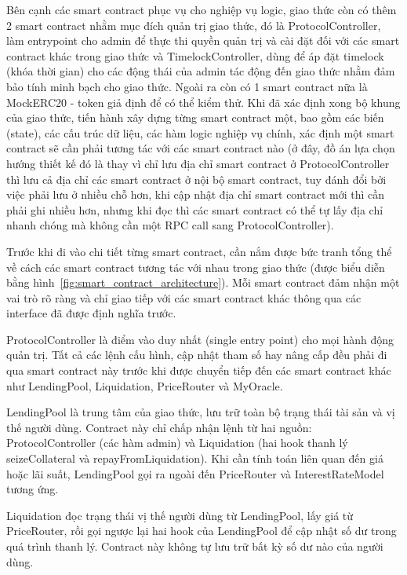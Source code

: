\documentclass[../DoAn.tex]{subfiles}
\begin{document}
Bên cạnh các smart contract phục vụ cho nghiệp vụ logic, giao thức còn có thêm 2 smart contract nhằm mục đích quản trị giao thức, đó là ProtocolController, làm entrypoint cho admin để thực thi quyền quản trị và cài đặt đối với các smart contract khác trong giao thức và TimelockController, dùng để áp đặt timelock (khóa thời gian) cho các động thái của admin tác động đến giao thức nhằm đảm bảo tính minh bạch cho giao thức. Ngoài ra còn có 1 smart contract nữa là MockERC20 - token giả định để có thể kiểm thử. Khi đã xác định xong bộ khung của giao thức, tiến hành xây dựng từng smart contract một, bao gồm các biến (state), các cấu trúc dữ liệu, các hàm logic nghiệp vụ chính, xác định một smart contract sẽ cần phải tương tác với các smart contract nào (ở đây, đồ án lựa chọn hướng thiết kế đó là thay vì chỉ lưu địa chỉ smart contract ở ProtocolController thì lưu cả địa chỉ các smart contract ở nội bộ smart contract, tuy đánh đổi bởi việc phải lưu ở nhiều chỗ hơn, khi cập nhật địa chỉ smart contract mới thì cần phải ghi nhiều hơn, nhưng khi đọc thì các smart contract có thể tự lấy địa chỉ nhanh chóng mà không cần một RPC call sang ProtocolController).

Trước khi đi vào chi tiết từng smart contract, cần nắm được bức tranh tổng thể về cách các smart contract tương tác với nhau trong giao thức (được biểu diễn bằng hình~\ref{fig:smart_contract_architecture}). Mỗi smart contract đảm nhận một vai trò rõ ràng và chỉ giao tiếp với các smart contract khác thông qua các interface đã được định nghĩa trước.

ProtocolController là điểm vào duy nhất (single entry point) cho mọi hành động quản trị. Tất cả các lệnh cấu hình, cập nhật tham số hay nâng cấp đều phải đi qua smart contract này trước khi được chuyển tiếp đến các smart contract khác như LendingPool, Liquidation, PriceRouter và MyOracle.

LendingPool là trung tâm của giao thức, lưu trữ toàn bộ trạng thái tài sản và vị thế người dùng. Contract này chỉ chấp nhận lệnh từ hai nguồn: ProtocolController (các hàm admin) và Liquidation (hai hook thanh lý seizeCollateral và repayFromLiquidation). Khi cần tính toán liên quan đến giá hoặc lãi suất, LendingPool gọi ra ngoài đến PriceRouter và InterestRateModel tương ứng.

Liquidation đọc trạng thái vị thế người dùng từ LendingPool, lấy giá từ PriceRouter, rồi gọi ngược lại hai hook của LendingPool để cập nhật số dư trong quá trình thanh lý. Contract này không tự lưu trữ bất kỳ số dư nào của người dùng.
\end{document}
